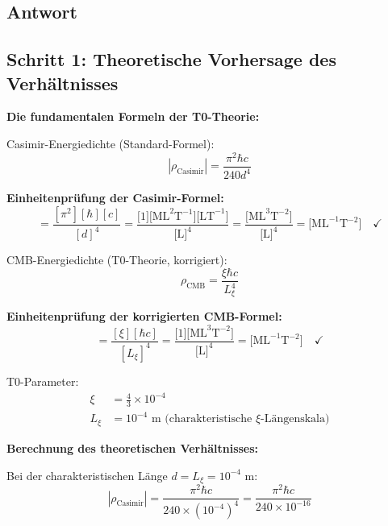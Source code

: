 \documentclass[12pt,a4paper]{article}
\theoremstyle{remark}
\newenvironment{answer}{\subsection*{Antwort}}{\vspace{1em}}
\begin{document}
\begin{answer}
	\subsection{Schritt 1: Theoretische Vorhersage des Verhältnisses}
	
	\textbf{Die fundamentalen Formeln der T0-Theorie:}
	
	Casimir-Energiedichte (Standard-Formel):
	\begin{equation}
		|\rho_{\text{Casimir}}| = \frac{\pi^2 \hbar c}{240 d^4}
	\end{equation}
	
	\begin{units}
		\textbf{Einheitenprüfung der Casimir-Formel:}
		\begin{equation}
			[|\rho_{\text{Casimir}}|] = \frac{[\pi^2][\hbar][c]}{[d]^4} = \frac{\text{[1][ML}^2\text{T}^{-1}\text{][LT}^{-1}\text{]}}{\text{[L]}^4} = \frac{\text{[ML}^3\text{T}^{-2}\text{]}}{\text{[L]}^4} = \text{[ML}^{-1}\text{T}^{-2}\text{]} \quad \checkmark
		\end{equation}
	\end{units}
	
	CMB-Energiedichte (T0-Theorie, korrigiert):
	\begin{equation}
		\rho_{\text{CMB}} = \frac{\xi \hbar c}{L_\xi^4}
	\end{equation}
	
	\begin{units}
		\textbf{Einheitenprüfung der korrigierten CMB-Formel:}
		\begin{equation}
			[\rho_{\text{CMB}}] = \frac{[\xi][\hbar c]}{[L_\xi]^4} = \frac{\text{[1][ML}^3\text{T}^{-2}\text{]}}{\text{[L]}^4} = \text{[ML}^{-1}\text{T}^{-2}\text{]} \quad \checkmark
		\end{equation}
	\end{units}
	
	T0-Parameter:
	\begin{align}
		\xi &= \frac{4}{3} \times 10^{-4} \\
		L_\xi &= 10^{-4} \text{ m (charakteristische } \xi\text{-Längenskala)}
	\end{align}
	
	\textbf{Berechnung des theoretischen Verhältnisses:}
	
	Bei der charakteristischen Länge $d = L_\xi = 10^{-4}$ m:
	\begin{equation}
		|\rho_{\text{Casimir}}| = \frac{\pi^2 \hbar c}{240 \times (10^{-4})^4} = \frac{\pi^2 \hbar c}{240 \times 10^{-16}}
	\end{equation}
	

\end{answer}
\end{document}
